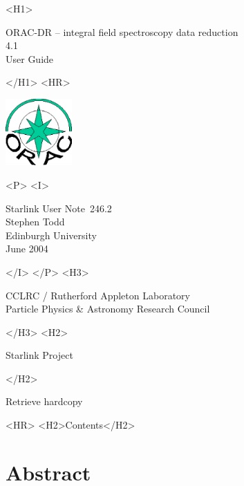 \documentclass[twoside,11pt]{article}
\newcommand{\stardoccategory}  {Starlink User Note}
\newcommand{\stardocsource}    {sun\stardocnumber}
\newcommand{\stardocnumber}    {246.2}
\newcommand{\stardocauthors}   {Stephen Todd \\
                                Edinburgh University}
\newcommand{\stardocdate}      {June 2004}
\newcommand{\stardoctitle}     {ORAC-DR -- integral field spectroscopy
  data reduction}
\newcommand{\stardocversion}   {4.1}
\newcommand{\stardocmanual}    {User Guide}
\newcommand{\htmladdnormallink}[2]{#1}
\newcommand{\htmladdimg}[1]{}
\newcommand{\htmlref}[2]{#1}
\newcommand{\htmladdtonavigation}[1]{}
\newcommand{\xlabel}[1]{}
\renewcommand{\_}{\texttt{\symbol{95}}}
\begin{document}
\begin{htmlonly}
   \xlabel{}
   \begin{rawhtml} <H1> \end{rawhtml}
      \stardoctitle\\
      \stardocversion\\
      \stardocmanual
   \begin{rawhtml} </H1> <HR> \end{rawhtml}

\includegraphics[width=1.0in]{sun246_logo.eps}

   \begin{rawhtml} <P> <I> \end{rawhtml}
   \stardoccategory\ \stardocnumber \\
   \stardocauthors \\
   \stardocdate
   \begin{rawhtml} </I> </P> <H3> \end{rawhtml}
      \htmladdnormallink{CCLRC / Rutherford Appleton Laboratory}
                        {http://www.cclrc.ac.uk} \\
      \htmladdnormallink{Particle Physics \& Astronomy Research Council}
                        {http://www.pparc.ac.uk} \\
   \begin{rawhtml} </H3> <H2> \end{rawhtml}
      \htmladdnormallink{Starlink Project}{http://www.starlink.rl.ac.uk/}
   \begin{rawhtml} </H2> \end{rawhtml}
   \htmladdnormallink{\htmladdimg{source.gif} Retrieve hardcopy}
      {http://www.starlink.rl.ac.uk/cgi-bin/hcserver?\stardocsource}\\

  \label{stardoccontents}
  \begin{rawhtml}
    <HR>
    <H2>Contents</H2>
  \end{rawhtml}
  \htmladdtonavigation{\htmlref{\htmladdimg{contents_motif.gif}}
        {stardoccontents}}

  \section{\xlabel{abstract}Abstract}
\end{htmlonly}
\end{document}

